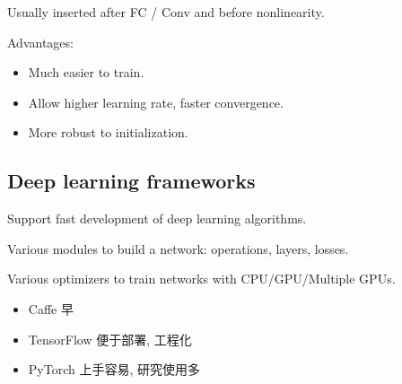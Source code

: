 Usually inserted after FC / Conv and before nonlinearity.

Advantages:
\begin{itemize}
    \item Much easier to train.
    \item Allow higher learning rate, faster convergence.
    \item More robust to initialization. 
\end{itemize}

\subsection{Deep learning frameworks}
Support fast development of deep learning algorithms.

Various modules to build a network: operations, layers, losses. 

Various optimizers to train networks with CPU/GPU/Multiple GPUs.

\begin{itemize}
    \item Caffe 早
    \item TensorFlow 便于部署, 工程化
    \item PyTorch 上手容易, 研究使用多
\end{itemize}

